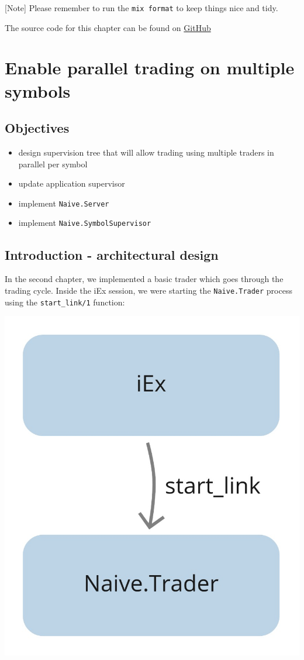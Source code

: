 \documentclass[
  oneside]{book}
\providecommand{\tightlist}{%
  \setlength{\itemsep}{0pt}\setlength{\parskip}{0pt}}
\begin{document}
{[}Note{]} Please remember to run the \texttt{mix\ format} to keep things nice and tidy.

The source code for this chapter can be found on \href{https://github.com/Cinderella-Man/hands-on-elixir-and-otp-cryptocurrency-trading-bot-source-code/tree/chapter_04}{GitHub}

\chapter{Enable parallel trading on multiple symbols}\label{enable-parallel-trading-on-multiple-symbols}

\section{Objectives}\label{objectives-4}

\begin{itemize}
\tightlist
\item
  design supervision tree that will allow trading using multiple traders in parallel per symbol
\item
  update application supervisor
\item
  implement \texttt{Naive.Server}
\item
  implement \texttt{Naive.SymbolSupervisor}
\end{itemize}

\section{Introduction - architectural design}\label{introduction---architectural-design}

In the second chapter, we implemented a basic trader which goes through the trading cycle. Inside the iEx session, we were starting the \texttt{Naive.Trader} process using the \texttt{start\_link/1} function:

\begin{center}\includegraphics[width=0.25\linewidth]{images/chapter_05_01_current_state} \end{center}
\end{document}
